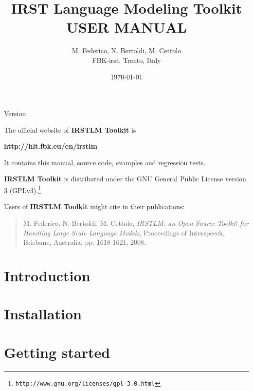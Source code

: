 \documentclass[11pt]{article}
\newcommand{\IRSTLM}{{\bf IRSTLM Toolkit}}
\newcommand*{\MyPath}{../}
\newcommand{\versionnumber}{}
\begin{document}
   

\title{IRST Language Modeling Toolkit \\USER MANUAL}
			         
\author{M. Federico, N. Bertoldi, M. Cettolo\\FBK-irst, Trento, Italy}			       
\date{\today}
 
\maketitle
\centerline{Version \versionnumber}

\vspace*{3cm}
\noindent
The official website of {\IRSTLM} is

\bigskip

{\bf http://hlt.fbk.eu/en/irstlm}

\bigskip
\noindent It contains this manual, source code, examples and regression tests.

\vspace*{1cm}
\noindent
{\IRSTLM} is distributed under the GNU General Public License version 3 (GPLv3).\footnote{\tt http://www.gnu.org/licenses/gpl-3.0.html}

\vspace*{1cm}
\noindent
Users of {\IRSTLM}  might cite in their publications:
\begin{quote}
M. Federico,  N. Bertoldi,  M. Cettolo, {\em IRSTLM: an Open Source Toolkit for Handling Large Scale Language Models}, Proceedings of Interspeech, Brisbane, Australia, pp. 1618-1621, 2008.
\end{quote}



\newpage
\setcounter{tocdepth}{2}  
\tableofcontents


\newpage
\section{Introduction}
\label{sec:introduction}



\newpage
\section{Installation}
\label{sec:installation}


\newpage
\section{Getting started}
\label{sec:gettingStarted}

\end{document}
